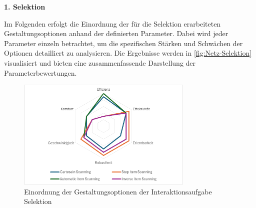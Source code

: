\textbf{1. Selektion}

Im Folgenden erfolgt die Einordnung der für die Selektion erarbeiteten Gestaltungsoptionen anhand der definierten Parameter. Dabei wird jeder Parameter einzeln betrachtet, um die spezifischen Stärken und Schwächen der Optionen detailliert zu analysieren. Die Ergebnisse werden in \autoref{fig:Netz-Selektion} visualisiert und bieten eine zusammenfassende Darstellung der Parameterbewertungen.

\begin{figure}[tbh]
    \centering
    \includegraphics[width=0.75\textwidth]{images/Netzdiagramm-Selektion.png}
    \caption{Einordnung der Gestaltungsoptionen der Interaktionsaufgabe Selektion}
    \label{fig:Netz-Selektion}
\end{figure}

